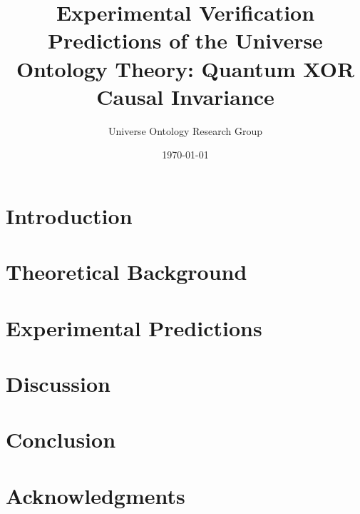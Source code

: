 \documentclass[aps,prl,twocolumn,superscriptaddress,floatfix]{revtex4-2}
\begin{document}
\title{Experimental Verification Predictions of the Universe Ontology Theory: Quantum XOR Causal Invariance}

\author{Universe Ontology Research Group}

\date{\today}

\begin{abstract}

\end{abstract}

\maketitle

\section{Introduction}


\section{Theoretical Background}


\section{Experimental Predictions}


\section{Discussion}


\section{Conclusion}


\section*{Acknowledgments}



\end{document}

